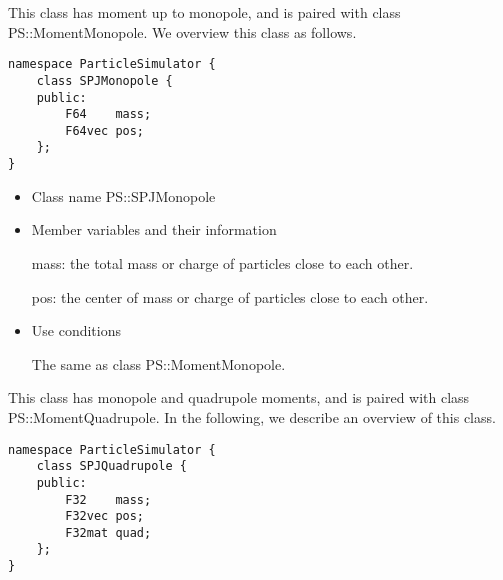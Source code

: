 

This class has moment up to monopole, and is paired with class
PS::MomentMonopole. We overview this class as follows.
\begin{screen}
\begin{verbatim}
namespace ParticleSimulator {
    class SPJMonopole {
    public:
        F64    mass;
        F64vec pos;
    };
}
\end{verbatim}
\end{screen}

\begin{itemize}
\item Class name
  PS::SPJMonopole

\item Member variables and their information

  mass: the total mass or charge of particles close to each other.

  pos: the center of mass or charge of particles close to each other.

\item Use conditions

  The same as class PS::MomentMonopole.

\end{itemize}


This class has monopole and quadrupole moments, and is paired with
class PS::MomentQuadrupole. In the following, we describe an overview
of this class.
\begin{screen}
\begin{verbatim}
namespace ParticleSimulator {
    class SPJQuadrupole {
    public:
        F32    mass;
        F32vec pos;
        F32mat quad;
    };
}
\end{verbatim}
\end{screen}


